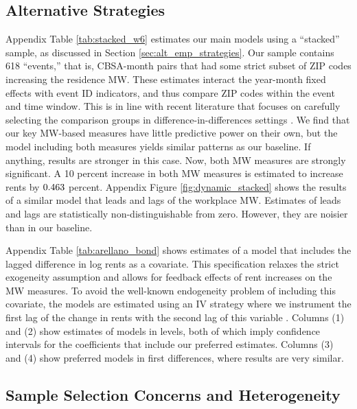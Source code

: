 \subsection{Alternative Strategies}
\label{sec:results_alternative_strategies}

Appendix Table \ref{tab:stacked_w6} estimates our main models using a 
``stacked'' sample, as discussed in Section \ref{sec:alt_emp_strategies}.
Our sample contains 618 ``events,'' that is, CBSA-month pairs that had some 
strict subset of ZIP codes increasing the residence MW.
These estimates interact the year-month fixed effects with event ID indicators, 
and thus compare ZIP codes within the event and time window.
This is in line with recent literature that focuses on carefully selecting the 
comparison groups in difference-in-differences settings
\parencite{deChaisemartinEtAl2022, RothEtAl2022}.
We find that our key MW-based measures have little predictive power on their own,
but the model including both measures yields similar patterns as our baseline.
If anything, results are stronger in this case.
Now, both MW measures are strongly significant.
A 10 percent increase in both MW measures is estimated to increase rents 
by $\textnormal{0.463}$ percent.
Appendix Figure \ref{fig:dynamic_stacked} shows the results of a similar model 
that leads and lags of the workplace MW.
Estimates of leads and lags are statistically non-distinguishable from zero.
However, they are noisier than in our baseline.

Appendix Table \ref{tab:arellano_bond} shows estimates of a model that includes
the lagged difference in log rents as a covariate.
This specification relaxes the strict exogeneity assumption and allows for 
feedback effects of rent increases on the MW measures.
To avoid the well-known endogeneity problem of including this covariate, the 
models are estimated using an IV strategy where we instrument the first lag of 
the change in rents with the second lag of this variable 
\parencite{ArellanoBond1991, ArellanoHonore2001}.
Columns (1) and (2) show estimates of models in levels, both of which imply
confidence intervals for the coefficients that include our preferred estimates.
Columns (3) and (4) show preferred models in first differences, where results
are very similar. 

\subsection{Sample Selection Concerns and Heterogeneity}
\label{sec:results_heterogeneity}

